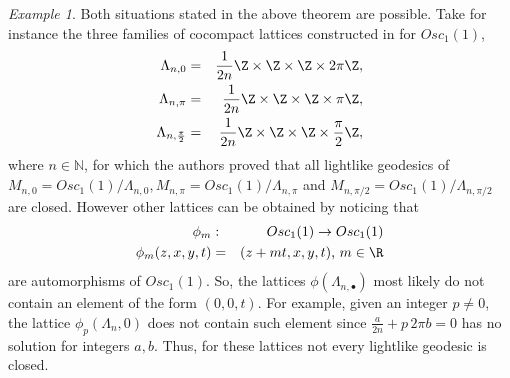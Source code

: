 \documentclass[11pt]{amsart}
\theoremstyle{plain}
\theoremstyle{definition}
\theoremstyle{remark}
\newtheorem{exa}[thm]{Example}
\begin{document}
		
		
		\begin{exa}\label{Lattice4} Both situations stated in the above theorem are possible. Take for instance the three families of cocompact lattices constructed in \cite{BOV} for  $Osc_1(1)$,
			\begin{eqnarray*} \label{geodlight}
				\Lambda_{n,0}&=&\frac{1}{2n}\Z \times \Z \times \Z \times 2 \pi \Z,\\
				\Lambda_{n,\pi}&=&\frac{1}{2n}\Z \times \Z \times \Z \times \pi \Z,\\
				\Lambda_{n,\frac{\pi}{2}}&=&\frac{1}{2n}\Z \times \Z \times \Z \times \frac{\pi}{2} \Z,
			\end{eqnarray*}
			where $n \in \mathbb{N}$, for which the authors proved that all lightlike geodesics of $M_{n,0}=Osc_1(1)/\Lambda_{n,0}, M_{n,\pi}=Osc_1(1)/\Lambda_{n,\pi}$ and $M_{n,\pi/2}=Osc_1(1)/\Lambda_{n,\pi/2}$ are closed. However other  lattices can be obtained by noticing that
			\begin{eqnarray*}
				\phi_m &:& Osc_1(1) \rightarrow Osc_1(1)\\
				\phi_m(z,x,y,t)&=&(z+mt,x,y,t) \textrm{,    $m \in \R$}
			\end{eqnarray*}
			are  automorphisms of $Osc_1(1)$. So, the  lattices $\phi(\Lambda_{n,\bullet})$ most likely do not contain an element of the form $(0,0, t)$. For example, given an integer $p \neq 0$, the lattice $\phi_p(\Lambda_n,0)$ does not contain such element since $\frac{a}{2 n}+ p \, 2 \pi b = 0$ has no solution for integers $a,b$. Thus, for these lattices not every lightlike geodesic is closed. \\
			
		\end{exa}
  
\end{document}
